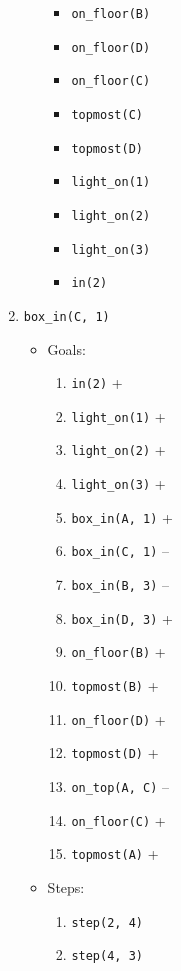 \documentclass[12pt]{article}
\begin{document}
\begin{enumerate}
\begin{itemize}
\begin{itemize}
          \item \texttt{on\_floor(B)}
          \item \texttt{on\_floor(D)}
          \item \texttt{on\_floor(C)}
          \item \texttt{topmost(C)}
          \item \texttt{topmost(D)}
          \item \texttt{light\_on(1)}
          \item \texttt{light\_on(2)}
          \item \texttt{light\_on(3)}
          \item \texttt{in(2)}
        \end{itemize}
    \end{itemize}
  \item \texttt{box\_in(C, 1)}
    \begin{itemize}
      \item Goals:
        \begin{enumerate}
          \item \texttt{in(2)} +
          \item \texttt{light\_on(1)} +
          \item \texttt{light\_on(2)} +
          \item \texttt{light\_on(3)} +
          \item \texttt{box\_in(A, 1)} +
          \item \texttt{box\_in(C, 1)} --
          \item \texttt{box\_in(B, 3)} --
          \item \texttt{box\_in(D, 3)} +
          \item \texttt{on\_floor(B)} +
          \item \texttt{topmost(B)} +
          \item \texttt{on\_floor(D)} +
          \item \texttt{topmost(D)} +
          \item \texttt{on\_top(A, C)} --
          \item \texttt{on\_floor(C)} +
          \item \texttt{topmost(A)} +
        \end{enumerate}
      \item Steps:
        \begin{enumerate}
          \item \texttt{step(2, 4)}
          \item \texttt{step(4, 3)}

\end{enumerate}
\end{itemize}
\end{enumerate}
\end{document}
